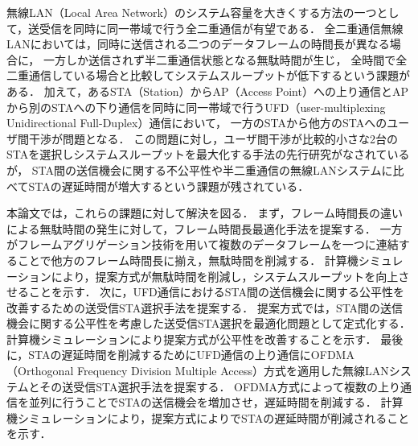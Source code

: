\documentclass[master]{kuisthesis}		%
\date{平成29年2月8日}				%
\begin{document}
\maketitle					%

\begin{jabstract}				%
	無線LAN（Local Area Network）のシステム容量を大きくする方法の一つとして，送受信を同時に同一帯域で行う全二重通信が有望である．
	全二重通信無線LANにおいては，同時に送信される二つのデータフレームの時間長が異なる場合に，
	一方しか送信されず半二重通信状態となる無駄時間が生じ，
	全時間で全二重通信している場合と比較してシステムスループットが低下するという課題がある．
	加えて，あるSTA（Station）からAP（Access Point）への上り通信とAPから別のSTAへの下り通信を同時に同一帯域で行うUFD（user-multiplexing Unidirectional Full-Duplex）通信において，
	一方のSTAから他方のSTAへのユーザ間干渉が問題となる．
	この問題に対し，ユーザ間干渉が比較的小さな2台のSTAを選択しシステムスループットを最大化する手法の先行研究がなされているが，
	STA間の送信機会に関する不公平性や半二重通信の無線LANシステムに比べてSTAの遅延時間が増大するという課題が残されている．
	\par
	本論文では，これらの課題に対して解決を図る．
	まず，フレーム時間長の違いによる無駄時間の発生に対して，フレーム時間長最適化手法を提案する．
	一方がフレームアグリゲーション技術を用いて複数のデータフレームを一つに連結することで他方のフレーム時間長に揃え，無駄時間を削減する．
	計算機シミュレーションにより，提案方式が無駄時間を削減し，システムスループットを向上させることを示す．
	次に，UFD通信におけるSTA間の送信機会に関する公平性を改善するための送受信STA選択手法を提案する．
	提案方式では，STA間の送信機会に関する公平性を考慮した送受信STA選択を最適化問題として定式化する．
	計算機シミュレーションにより提案方式が公平性を改善することを示す．
	最後に，STAの遅延時間を削減するためにUFD通信の上り通信にOFDMA（Orthogonal Frequency Division Multiple Access）方式を適用した無線LANシステムとその送受信STA選択手法を提案する．
	OFDMA方式によって複数の上り通信を並列に行うことでSTAの送信機会を増加させ，遅延時間を削減する．
	計算機シミュレーションにより，提案方式によりでSTAの遅延時間が削減されることを示す．
\end{jabstract}
\end{document}
